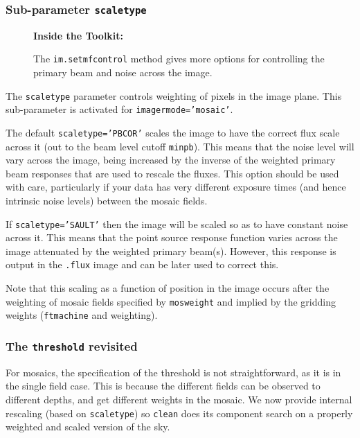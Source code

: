 \subsubsection{Sub-parameter {\tt scaletype} }
\label{section:im.clean.imagermode.scaletype}

\begin{wrapfigure}{r}{2.5in}
  \begin{boxedminipage}{2.5in}
     \centerline{\bf Inside the Toolkit:}
     The {\tt im.setmfcontrol} method gives more options for
     controlling the primary beam and noise across the image.
  \end{boxedminipage}
\end{wrapfigure}

The {\tt scaletype} parameter controls weighting of pixels in the 
image plane.  This sub-parameter is activated for {\tt imagermode='mosaic'}.

The default {\tt scaletype='PBCOR'} scales the
image to have the correct flux scale across it (out to the beam
level cutoff {\tt minpb}).  This means that the noise level will
vary across the image, being increased by the inverse of the 
weighted primary beam responses that are used to rescale the
fluxes.  This option should
be used with care, particularly if your data has very different exposure
times (and hence intrinsic noise levels) between the mosaic fields.

If {\tt scaletype='SAULT'} then the image will be scaled so as to have
constant noise across it.  This means that the point source response
function varies across the image attenuated by the weighted primary
beam(s).  However, this response is output in the {\tt .flux} image
and can be later used to correct this.

Note that this scaling as a function of position in the image occurs
after the weighting of mosaic fields specified by {\tt mosweight}
and implied by the gridding weights ({\tt ftmachine} and {weighting}).

\subsubsection{The {\tt threshold} revisited}
\label{section:im.clean.imagermode.threshold}

For mosaics, the specification of the threshold is not
straightforward, as it is in the single field case.  This is because
the different fields can be observed to different depths, and get
different weights in the mosaic.  We now provide internal rescaling
(based on {\tt scaletype}) so {\tt clean} does
its component search on a properly weighted and scaled version of the sky.


